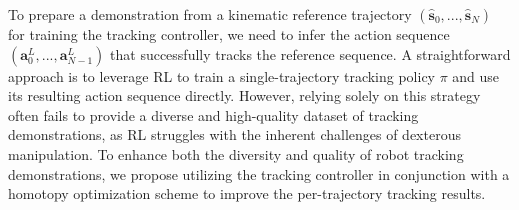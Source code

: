 To prepare a demonstration from a kinematic reference trajectory \((\hat{\mathbf{s}}_0, ..., \hat{\mathbf{s}}_N)\) for training the tracking controller, we need to infer the action sequence \((\mathbf{a}^L_0, ..., \mathbf{a}^L_{N-1})\) that successfully tracks the reference sequence.  
A straightforward approach is to leverage RL to train a single-trajectory tracking policy \(\pi\) and use its resulting action sequence directly. 
However, relying solely on this strategy often fails to provide a diverse and high-quality dataset of tracking demonstrations, as RL struggles with the inherent challenges of dexterous manipulation.
To enhance both the diversity and quality of robot tracking demonstrations, we propose utilizing the tracking controller in conjunction with a homotopy optimization scheme to improve the per-trajectory tracking results.





